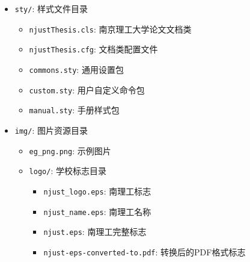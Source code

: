 \begin{itemize}
\item \texttt{sty/}: 样式文件目录
    \begin{itemize}
        \item \texttt{njustThesis.cls}: 南京理工大学论文文档类
        \item \texttt{njustThesis.cfg}: 文档类配置文件
        \item \texttt{commons.sty}: 通用设置包
        \item \texttt{custom.sty}: 用户自定义命令包
        \item \texttt{manual.sty}: 手册样式包
    \end{itemize}

\item \texttt{img/}: 图片资源目录
    \begin{itemize}
        \item \texttt{eg\_png.png}: 示例图片
        \item \texttt{logo/}: 学校标志目录
            \begin{itemize}
                \item \texttt{njust\_logo.eps}: 南理工标志
                \item \texttt{njust\_name.eps}: 南理工名称
                \item \texttt{njust.eps}: 南理工完整标志
                \item \texttt{njust-eps-converted-to.pdf}: 转换后的PDF格式标志
            \end{itemize}
    \end{itemize}

\end{itemize}




